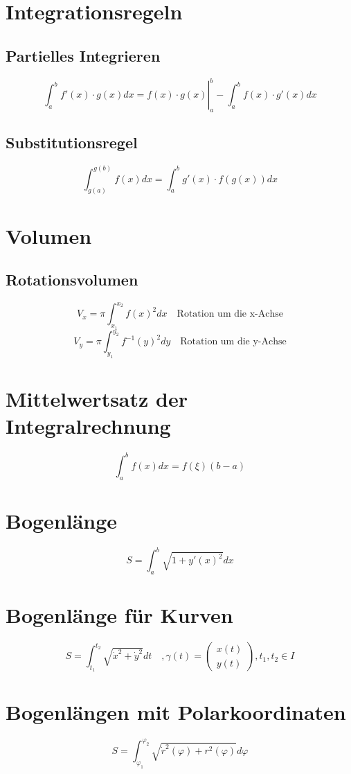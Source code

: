 \section{Integrationsregeln}
\subsection{Partielles Integrieren}
\[ \boxed{\left. \int_a^b f'(x) \cdot g(x) dx = f(x) \cdot g(x) \right|_a^b - \int_a^b f(x) \cdot g'(x) dx} \]
\subsection{Substitutionsregel}
\[ \boxed{\int_{g(a)}^{g(b)} f(x) dx = \int_{a}^{b} g'(x) \cdot f(g(x)) dx} \]


\section{Volumen}
\subsection{Rotationsvolumen}
\[ \boxed{V_x = \pi \int_{x_1}^{x_2} f(x)^2 dx} \quad \text{Rotation um die x-Achse}\]
\[ \boxed{V_y = \pi \int_{y_1}^{y_2} f^{-1}(y)^2 dy} \quad \text{Rotation um die y-Achse}\]

\section{Mittelwertsatz der Integralrechnung}
\[ \boxed{\int_{a}^{b} f(x) dx = f(\xi)(b-a)} \]

\section{Bogenlänge}
\[ \boxed{S = \int_{a}^{b} \sqrt{1 + y'(x)^2} dx} \]

\section{Bogenlänge für Kurven}
\[ \boxed{S = \int_{t_1}^{t_2}\sqrt{\dot{x}^2 + \dot{y}^2} dt \quad ,\gamma(t) = \left(\begin{matrix}x(t)\\y(t)\end{matrix}\right), t_1, t_2 \in I} \]

\section{Bogenlängen mit Polarkoordinaten}
\[ \boxed{S = \int_{\varphi_1}^{\varphi_2}\sqrt{\dot{r}^2(\varphi) + r^2(\varphi)}d\varphi} \]

